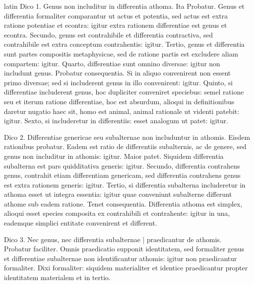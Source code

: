 \begin{otherlanguage*}{latin}
\pstart
  Dico 1. Genus non includitur in differentia athoma. Ita  Probatur. Genus et differentia formaliter comparantur ut actus et potentia, sed actus est extra ratione potentiae et econtra: igitur extra rationem differentiae est genus et econtra. Secundo, genus est contrahibile et differentia contractiva, sed contrahibile est extra conceptum contrahentis: igitur. Tertio, genus et differentia sunt partes compositis metaphysicae, sed de ratione partis est excludere aliam compartem: igitur. Quarto, differentiae sunt omnino diversae: igitur non includunt genus. Probatur consequentia. Si in aliquo convenirent non essent primo diversae; sed si includerent genus in illo convenirent: igitur. Quinto, si differentiae includerent genus, hoc dupliciter conveniret speciebus: semel ratione seu et iterum ratione differentiae, hoc est absurdum, alioqui in definitionibus daretur nugatio haec sit, homo est animal, animal rationale ut videnti patebit: igitur. Sexto, si includeretur in differentiis: esset analogum ut patet: igitur. 
\pend

\pstart
 Dico 2. Differentiae genericae seu subalternae non includuntur in athomis. Eisdem rationibus probatur. Eadem est ratio de differentiis subalternis, ac de genere, sed genus non includitur in athomis: igitur. Maior patet. Siquidem differentia subalterna est pars quidditativa generis: igitur. Secundo, differentia contrahens genus, contrahit etiam differentiam genericam, sed differentia contrahens genus est extra rationem generis: igitur. Tertio, si differentia subalterna includeretur in athoma esset ut integra essentia: igitur quae conveniunt subalterne differunt athome sub eadem ratione. Tenet consequentia. Differentia athoma est simplex, alioqui esset species composita ex contrahibili et contrahente: igitur in una, eademque simplici entitate convenirent et different. 
\pend

\pstart
 Dico 3. Nec genus, nec differentia subalternae \textnormal{|}   praedicantur de athomis. Probatur faciliter. Omnis praedicatio supponit identitatem, sed formaliter genus et differentiae subalternae non identificantur athomis: igitur non praedicantur formaliter. Dixi formaliter: siquidem materialiter et identice praedicantur propter identitatem materialem et in tertio. 
\pend


\end{otherlanguage*}
